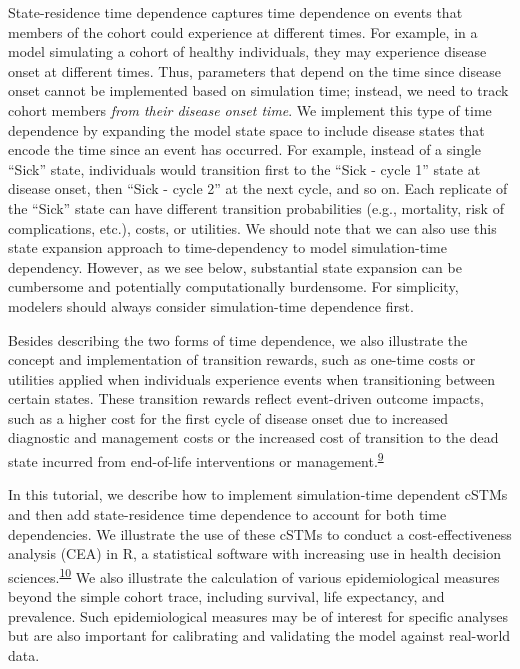 \documentclass[
]{article}
\begin{document}
State-residence time dependence captures time dependence on events that members of the cohort could experience at different times. For example, in a model simulating a cohort of healthy individuals, they may experience disease onset at different times. Thus, parameters that depend on the time since disease onset cannot be implemented based on simulation time; instead, we need to track cohort members \emph{from their disease onset time}. We implement this type of time dependence by expanding the model state space to include disease states that encode the time since an event has occurred. For example, instead of a single ``Sick'' state, individuals would transition first to the ``Sick - cycle 1'' state at disease onset, then ``Sick - cycle 2'' at the next cycle, and so on. Each replicate of the ``Sick'' state can have different transition probabilities (e.g., mortality, risk of complications, etc.), costs, or utilities. We should note that we can also use this state expansion approach to time-dependency to model simulation-time dependency. However, as we see below, substantial state expansion can be cumbersome and potentially computationally burdensome. For simplicity, modelers should always consider simulation-time dependence first.

Besides describing the two forms of time dependence, we also illustrate the concept and implementation of transition rewards, such as one-time costs or utilities applied when individuals experience events when transitioning between certain states. These transition rewards reflect event-driven outcome impacts, such as a higher cost for the first cycle of disease onset due to increased diagnostic and management costs or the increased cost of transition to the dead state incurred from end-of-life interventions or management.\textsuperscript{\protect\hyperlink{ref-Krijkamp2019}{9}}

In this tutorial, we describe how to implement simulation-time dependent cSTMs and then add state-residence time dependence to account for both time dependencies. We illustrate the use of these cSTMs to conduct a cost-effectiveness analysis (CEA) in R, a statistical software with increasing use in health decision sciences.\textsuperscript{\protect\hyperlink{ref-Jalal2017b}{10}} We also illustrate the calculation of various epidemiological measures beyond the simple cohort trace, including survival, life expectancy, and prevalence. Such epidemiological measures may be of interest for specific analyses but are also important for calibrating and validating the model against real-world data.
\end{document}
